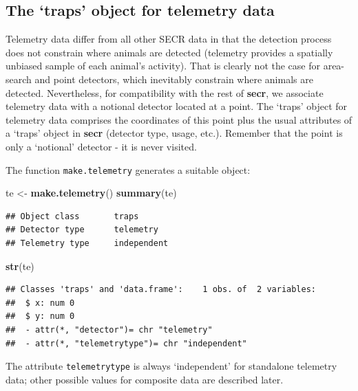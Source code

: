 \documentclass[
]{book}
\newenvironment{Shaded}{\begin{snugshade}}{\end{snugshade}}
\newcommand{\FunctionTok}[1]{\textcolor[rgb]{0.13,0.29,0.53}{\textbf{#1}}}
\newcommand{\NormalTok}[1]{#1}
\newcommand{\OtherTok}[1]{\textcolor[rgb]{0.56,0.35,0.01}{#1}}
\begin{document}
\subsection{The `traps' object for telemetry data}\label{the-traps-object-for-telemetry-data}

Telemetry data differ from all other SECR data in that the detection process does not constrain where animals are detected (telemetry provides a spatially unbiased sample of each animal's activity). That is clearly not the case for area-search and point detectors, which inevitably constrain where animals are detected. Nevertheless, for compatibility with the rest of \textbf{secr}, we associate telemetry data with a notional detector located at a point. The `traps' object for telemetry data comprises the coordinates of this point plus the usual attributes of a `traps' object in \textbf{secr} (detector type, usage, etc.). Remember that the point is only a `notional' detector - it is never visited.

The function \texttt{make.telemetry} generates a suitable object:

\begin{Shaded}
\begin{Highlighting}[]
\NormalTok{te }\OtherTok{\textless{}{-}} \FunctionTok{make.telemetry}\NormalTok{()}
\FunctionTok{summary}\NormalTok{(te)}
\end{Highlighting}
\end{Shaded}

\begin{verbatim}
## Object class       traps 
## Detector type      telemetry 
## Telemetry type     independent
\end{verbatim}

\begin{Shaded}
\begin{Highlighting}[]
\FunctionTok{str}\NormalTok{(te)}
\end{Highlighting}
\end{Shaded}

\begin{verbatim}
## Classes 'traps' and 'data.frame':    1 obs. of  2 variables:
##  $ x: num 0
##  $ y: num 0
##  - attr(*, "detector")= chr "telemetry"
##  - attr(*, "telemetrytype")= chr "independent"
\end{verbatim}

The attribute \texttt{telemetrytype} is always `independent' for standalone telemetry data; other possible values for composite data are described later.
\end{document}

